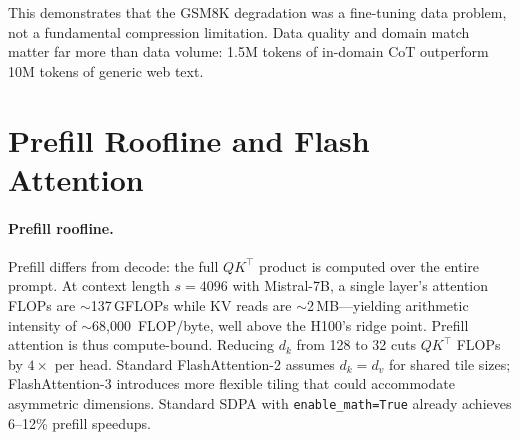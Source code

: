 \documentclass[11pt]{article}
\begin{document}
\begin{table}[h]
\end{table}

This demonstrates that the GSM8K degradation was a fine-tuning data problem, not a fundamental compression limitation. Data quality and domain match matter far more than data volume: 1.5M tokens of in-domain CoT outperform 10M tokens of generic web text.


\section{Prefill Roofline and Flash Attention}\label{app:throughput}

\paragraph{Prefill roofline.}
Prefill differs from decode: the full $QK^\top$ product is computed over the entire prompt. At context length $s = 4096$ with Mistral-7B, a single layer's attention FLOPs are $\sim$137\,GFLOPs while KV reads are $\sim$2\,MB---yielding arithmetic intensity of $\sim$68{,}000~FLOP/byte, well above the H100's ridge point. Prefill attention is thus compute-bound. Reducing $d_k$ from 128 to 32 cuts $QK^\top$ FLOPs by $4\times$ per head. Standard FlashAttention-2 assumes $d_k = d_v$ for shared tile sizes; FlashAttention-3 \citep{flashattention32024} introduces more flexible tiling that could accommodate asymmetric dimensions. Standard SDPA with \texttt{enable\_math=True} already achieves 6--12\% prefill speedups.
\end{document}
